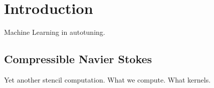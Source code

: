 \section{Introduction} %

Machine Learning in autotuning.

\subsection{Compressible Navier Stokes}
Yet another stencil computation. What we compute. What kernels.
